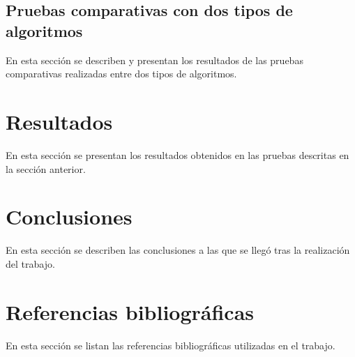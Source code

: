 \documentclass[12pt,a4paper]{article}
\begin{document}
\subsection{Pruebas comparativas con dos tipos de algoritmos}
En esta sección se describen y presentan los resultados de las pruebas comparativas realizadas entre dos tipos de algoritmos.

\section{Resultados}
En esta sección se presentan los resultados obtenidos en las pruebas descritas en la sección anterior.

\section{Conclusiones}
En esta sección se describen las conclusiones a las que se llegó tras la realización del trabajo.

\section{Referencias bibliográficas}
En esta sección se listan las referencias bibliográficas utilizadas en el trabajo.
\end{document}
